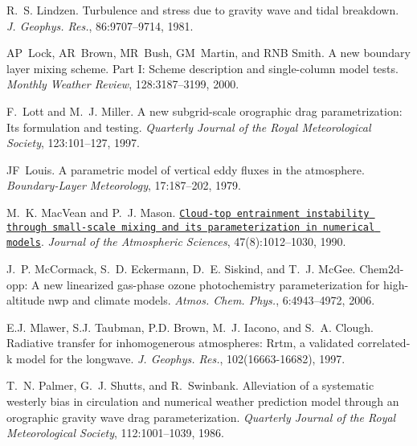 \begin{DoxyDescription}
\item[\label{_CITEREF_lindzen_1981}%
\mbox{[}40\mbox{]}]R.~S. Lindzen. Turbulence and stress due to gravity wave and tidal breakdown. {\itshape J. Geophys. Res.}, 86\+:9707--9714, 1981.


\item[\label{_CITEREF_lock_et_al_2000}%
\mbox{[}41\mbox{]}]AP~Lock, AR~Brown, MR~Bush, GM~Martin, and R\+NB Smith. A new boundary layer mixing scheme. Part I\+: Scheme description and single-\/column model tests. {\itshape Monthly Weather Review}, 128\+:3187--3199, 2000.


\item[\label{_CITEREF_lott_and_miller_1997}%
\mbox{[}42\mbox{]}]F.~Lott and M.~J. Miller. A new subgrid-\/scale orographic drag parametrization\+: Its formulation and testing. {\itshape Quarterly Journal of the Royal Meteorological Society}, 123\+:101--127, 1997.


\item[\label{_CITEREF_louis_1979}%
\mbox{[}43\mbox{]}]JF~Louis. A parametric model of vertical eddy fluxes in the atmosphere. {\itshape Boundary-\/\+Layer Meteorology}, 17\+:187--202, 1979.


\item[\label{_CITEREF_macvean_and_mason_1990}%
\mbox{[}44\mbox{]}]M.~K. Mac\+Vean and P.~J. Mason. \href{http://dx.doi.org/10.1175/1520-0469(1990)047<1012:CTEITS>2.0.CO;2}{\tt Cloud-\/top entrainment instability through small-\/scale mixing and its parameterization in numerical models}. {\itshape Journal of the Atmospheric Sciences}, 47(8)\+:1012--1030, 1990. 


\item[\label{_CITEREF_mccormack_et_al_2006}%
\mbox{[}45\mbox{]}]J.~P. Mc\+Cormack, S.~D. Eckermann, D.~E. Siskind, and T.~J. Mc\+Gee. Chem2d-\/opp\+: A new linearized gas-\/phase ozone photochemistry parameterization for high-\/altitude nwp and climate models. {\itshape Atmos. Chem. Phys.}, 6\+:4943--4972, 2006.


\item[\label{_CITEREF_mlawer_et_al_1997}%
\mbox{[}46\mbox{]}]E.\+J. Mlawer, S.\+J. Taubman, P.\+D. Brown, M.~J. Iacono, and S.~A. Clough. Radiative transfer for inhomogenerous atmospheres\+: Rrtm, a validated correlated-\/k model for the longwave. {\itshape J. Geophys. Res.}, 102(16663-\/16682), 1997.


\item[\label{_CITEREF_palmer_et_al_1986}%
\mbox{[}47\mbox{]}]T.~N. Palmer, G.~J. Shutts, and R.~Swinbank. Alleviation of a systematic westerly bias in circulation and numerical weather prediction model through an orographic gravity wave drag parameterization. {\itshape Quarterly Journal of the Royal Meteorological Society}, 112\+:1001--1039, 1986.



\end{DoxyDescription}
